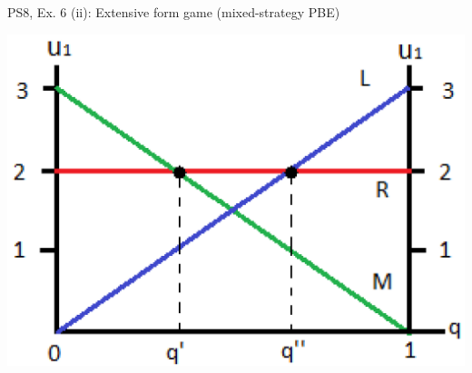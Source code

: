\begin{frame}{PS8, Ex. 6 (ii): Extensive form game (mixed-strategy PBE)}
\begin{multicols}{2}
\begin{figure}[!h]
      \end{figure}
      \includegraphics[width=1.1\columnwidth]{figures/Gibbons_4_2_E[u]}
      \vfill\null
    \end{multicols}
\end{frame}
